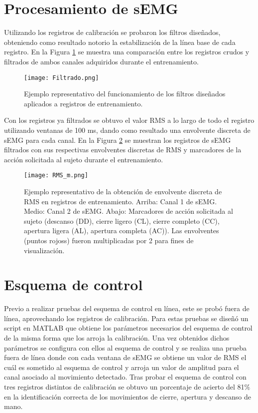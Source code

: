 
\section{Procesamiento de sEMG}

Utilizando los registros de calibración se probaron los filtros diseñados, obteniendo como resultado notorio la estabilización de la línea base de cada registro. En la Figura \ref{Figura: Filtrado} se muestra una comparación entre los registros crudos y filtrados de ambos canales adquiridos durante el entrenamiento.

\begin{figure}[htbp]
	\centering
	\texttt{[image: Filtrado.png]}
	\caption{Ejemplo representativo del funcionamiento de los filtros diseñados aplicados a registros de entrenamiento.}
	\label{Figura: Filtrado}
\end{figure}

Con los registros ya filtrados se obtuvo el valor RMS a lo largo de todo el registro utilizando ventanas de 100 ms, dando como resultado una envolvente discreta de sEMG para cada canal. En la Figura \ref{Figura: RMS} se muestran los registros de sEMG filtrados con sus respectivas envolventes discretas de RMS y marcadores de la acción solicitada al sujeto durante el entrenamiento.

\begin{figure}[htbp]
	\centering
	\texttt{[image: RMS\_m.png]}
	\caption{Ejemplo representativo de la obtención de envolvente discreta de RMS en registros de entrenamiento. Arriba: Canal 1 de sEMG. Medio: Canal 2 de sEMG. Abajo: Marcadores de acción solicitada al sujeto (descanso (DD), cierre ligero (CL), cierre completo (CC), apertura ligera (AL), apertura completa (AC)). Las envolventes (puntos rojoss) fueron multiplicadas por 2 para fines de visualización.}
	\label{Figura: RMS}
\end{figure}

\section{Esquema de control}
Previo a realizar pruebas del esquema de control en línea, este se probó fuera de línea, aprovechando los registros de calibración. Para estas pruebas se diseñó un script en MATLAB que obtiene los parámetros necesarios del esquema de control de la misma forma que los arroja la calibración. Una vez obtenidos dichos parámetros se configura con ellos al esquema de control y se realiza una prueba fuera de línea donde con cada ventana de sEMG se obtiene un valor de RMS el cuál es sometido al esquema de control y arroja un valor de amplitud para el canal asociado al movimiento detectado. Tras probar el esquema de control con tres registros distintos de calibración se obtuvo un porcentaje de acierto del 81$\%$ en la identificación correcta de los movimientos de cierre, apertura y descanso de mano.

